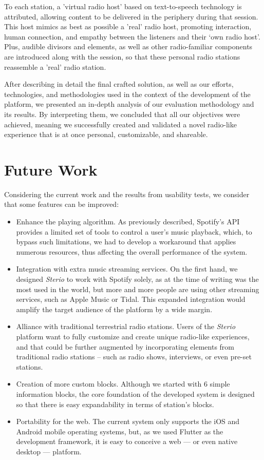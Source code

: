 To each station, a 'virtual radio host' based on text-to-speech technology is attributed, allowing content to be delivered in the periphery during that session. This host mimics as best as possible a 'real' radio host, promoting interaction, human connection, and empathy between the listeners and their ‘own radio host’. Plus, audible divisors and elements, as well as other radio-familiar components are introduced along with the session, so that these personal radio stations reassemble a 'real' radio station.

After describing in detail the final crafted solution, as well as our efforts, technologies, and methodologies used in the context of the development of the platform, we presented an in-depth analysis of our evaluation methodology and its results. By interpreting them, we concluded that all our objectives were achieved, meaning we successfully created and validated a novel radio-like experience that is at once personal, customizable, and shareable.

\section{Future Work}

Considering the current work and the results from usability tests, we consider that some features can be improved:

\begin{itemize}
	\item Enhance the playing algorithm. As previously described, Spotify's \ac{API} provides a limited set of tools to control a user's music playback, which, to bypass such limitations, we had to develop a workaround that applies numerous resources, thus affecting the overall performance of the system.
	\item Integration with extra music streaming services. On the first hand, we designed \textit{Sterio} to work with Spotify solely, as at the time of writing was the most used in the world, but more and more people are using other streaming services, such as Apple Music or Tidal. This expanded integration would amplify the target audience of the platform by a wide margin.
	\item Alliance with traditional terrestrial radio stations. Users of the \textit{Sterio} platform want to fully customize and create unique radio-like experiences, and that could be further augmented by incorporating elements from traditional radio stations – such as radio shows, interviews, or even pre-set stations.
	\item Creation of more custom blocks. Although we started with 6 simple information blocks, the core foundation of the developed system is designed so that there is easy expandability in terms of station's blocks.
	\item Portability for the web. The current system only supports the iOS and Android mobile operating systems, but, as we used Flutter as the development framework, it is easy to conceive a web — or even native desktop — platform.
\end{itemize}


